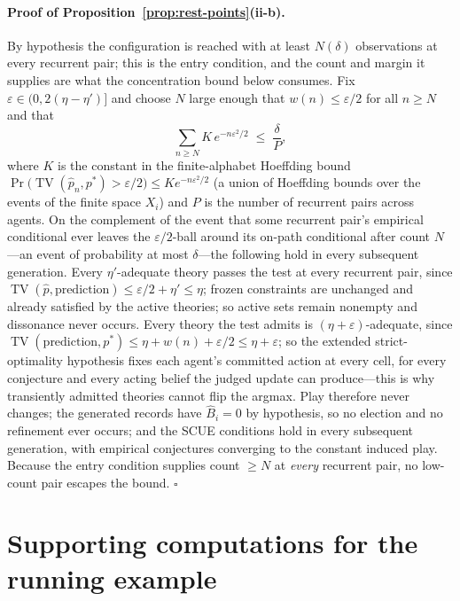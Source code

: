\documentclass[11pt]{article}
\theoremstyle{definition}
\newcommand{\TV}{\operatorname{TV}}
\begin{document}
\paragraph{Proof of Proposition~\ref{prop:rest-points}(ii-b).}
By hypothesis the configuration is reached with at least $N(\delta)$
observations at every recurrent pair; this is the entry condition, and the
count and margin it supplies are what the concentration bound below consumes.
Fix $\varepsilon\in(0,2(\eta-\eta')]$ and choose $N$ large enough that
$w(n)\leq\varepsilon/2$ for all $n\geq N$ and that
\[
\sum_{n\geq N}K\,e^{-n\varepsilon^{2}/2}\;\leq\;\frac{\delta}{P},
\]
where $K$ is the constant in the finite-alphabet Hoeffding bound
$\Pr\bigl(\TV(\hat p_n,p^{*})>\varepsilon/2\bigr)\leq K e^{-n\varepsilon^{2}/2}$
(a union of Hoeffding bounds over the events of the finite space $X_i$) and
$P$ is the number of recurrent pairs across agents.  On the complement of
the event that some recurrent pair's empirical conditional ever leaves the
$\varepsilon/2$-ball around its on-path conditional after count $N$---an
event of probability at most $\delta$---the following hold in every
subsequent generation.  Every $\eta'$-adequate theory passes the test at
every recurrent pair, since
$\TV(\hat p,\text{prediction})\leq\varepsilon/2+\eta'\leq\eta$; frozen
constraints are unchanged and already satisfied by the active theories; so
active sets remain nonempty and dissonance never occurs.  Every theory the
test admits is $(\eta+\varepsilon)$-adequate, since
$\TV(\text{prediction},p^{*})\leq\eta+w(n)+\varepsilon/2\leq\eta+\varepsilon$;
so the extended strict-optimality hypothesis fixes each agent's committed
action at every cell, for every conjecture and every acting belief the
judged update can produce---this is why transiently admitted theories cannot
flip the argmax.  Play therefore never changes; the generated records have
$\widehat B_i=0$ by hypothesis, so no election and no refinement ever occurs;
and the SCUE conditions hold in every subsequent generation, with empirical
conjectures converging to the constant induced play.  Because the entry
condition supplies count $\geq N$ at \emph{every} recurrent pair, no low-count
pair escapes the bound.  \hfill$\square$

\section{Supporting computations for the running example}
\label{app:example}
\end{document}

